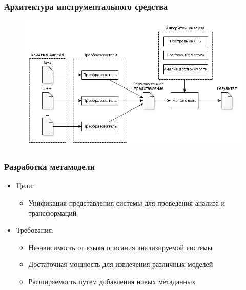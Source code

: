 \documentclass{beamer}
\begin{document}
\begin{frame}
\frametitle{Архитектура инструментального средства}

\begin{figure}[h!]
    \begin{center}
        \includegraphics[width=\textwidth]{img/architecture.png}
    \end{center}
\end{figure}
\end{frame}
\begin{frame}
\frametitle{Разработка метамодели}

\begin{itemize}
    \item Цели:
        \begin{itemize}
            \item Унификация представления системы для проведения анализа и трансформаций
        \end{itemize}
    \item Требования:
        \begin{itemize}
            \item Независимость от языка описания анализируемой системы
            \item Достаточная мощность для извлечения различных моделей
            \item Расширяемость путем добавления новых метаданных
        \end{itemize}
\end{itemize}

\end{frame}
\end{document}
